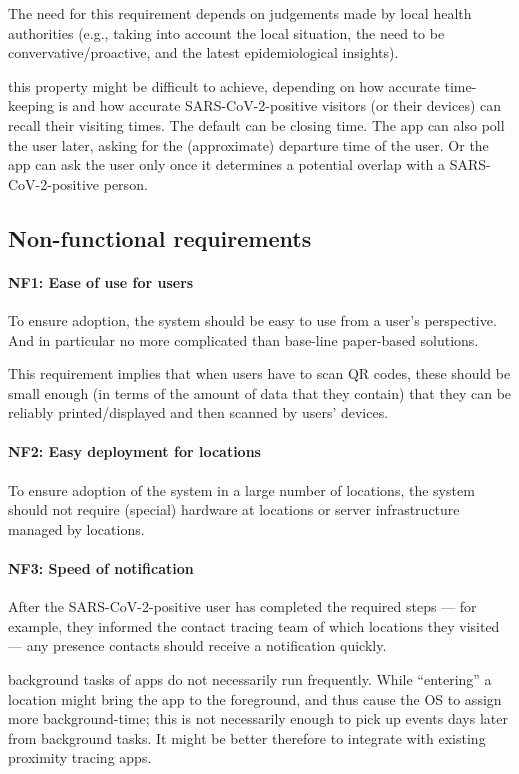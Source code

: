  The need for this requirement depends on judgements made by local health authorities (e.g., taking into account the local situation, the need to be convervative/proactive, and the latest epidemiological insights).

 this property might be difficult to achieve, depending on how accurate time-keeping is and how accurate SARS-CoV-2-positive visitors (or their devices) can recall their visiting times. The default can be closing time. The app can also poll the user later, asking for the (approximate) departure time of the user. Or the app can ask the user only once it determines a potential overlap with a SARS-CoV-2-positive person.

\subsection{Non-functional requirements}
\paragraph{NF1: Ease of use for users} To ensure adoption, the system should be easy to use from a user’s perspective. And in particular no more complicated than base-line paper-based solutions.

This requirement implies that when users have to scan QR codes, these should be small enough (in terms of the amount of data that they contain) that they can be reliably printed/displayed and then scanned by users’ devices.

\paragraph{NF2: Easy deployment for locations} To ensure adoption of the system in a large number of locations, the system should not require (special) hardware at locations or server infrastructure managed by locations. 

\paragraph{NF3: Speed of notification} After the SARS-CoV-2-positive user has completed the required steps --- for example, they informed the contact tracing team of which locations they visited --- any presence contacts should receive a notification quickly.

 background tasks of apps do not necessarily run frequently.
While ``entering'' a location might bring the app to the foreground, and thus cause the OS to assign more background-time; this is not necessarily enough to pick up events days later from background tasks. It might be better therefore to integrate with existing proximity tracing apps.

